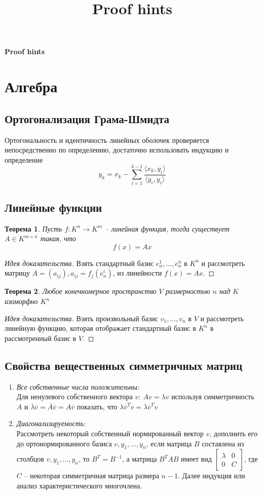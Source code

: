 \documentclass[10pt,a4paper]{article}
\title{Proof hints}
\newtheorem{theorem_ru}{Теорема}[section]
\newenvironment{sketch}
    {\begin{proof}[Идея доказательства]
    }
    { 
    \end{proof}
    }
\begin{document}
\begin{center}
\Large{\textbf{Proof hints}}
\end{center}
\tableofcontents

\section{Алгебра}
\subsection{Ортогонализация Грама-Шмидта}
Ортогональность и идентичность линейных оболочек проверяется непосредственно по определению, достаточно использовать индукцию и определение
\[
y_k=x_k-\sum_{i=1}^{k-1}\frac{\langle x_k, y_i\rangle}{\langle y_i, y_i\rangle}
\]
\subsection{Линейные функции}
\begin{theorem_ru}
Пусть $f:K^n\rightarrow K^m$ -- линейная функция, тогда существует $A\in K^{m\times n}$ такая, что 
$$
f(x)=Ax
$$
\end{theorem_ru}
\begin{proof}[Идея доказательства]
Взять стандартный базис $e_n^1, \ldots, e_n^n$ в $K^n$ и рассмотреть матрицу $A=(a_{ij}), a_{ij}=f_j(e_n^i)$, из линейности $f(x)=Ax$.
\end{proof}
\begin{theorem_ru}
Любое конечномерное пространство $V$ размерностью $n$ над $K$ изоморфно $K^n$
\end{theorem_ru}
\begin{sketch}
Взять произвольный базис $v_1, \ldots, v_n$ в $V$ и рассмотреть линейную функцию, которая отображает стандартный базис в $K^n$ в рассмотренный базис в $V$.
\end{sketch}

\subsection{Свойства вещественных симметричных матриц}
\begin{enumerate}
\item \textit{Все собственные числа положительны}:\\
Для ненулевого собственного вектора $v:~Av=\lambda v$ используя симметричность $A$ и $\overline{\lambda}\overline{v}=\overline{A}\overline{v}=A\overline{v}$ показать, что $\lambda \overline{v}^Tv=\overline{\lambda} \overline{v}^Tv$
\item \textit{Диагонализируемость}:\\
Рассмотреть некоторый собственный нормированный вектор $v$, дополнить его до ортонормированного базиса $v, y_1, \ldots, y_n$, если матрица $B$ составлена из столбцов $v, y_1, \ldots, y_n$, то $B^T=B^{-1}$, а матрица $B^TAB$ имеет вид
$\left[
\begin{array}{cc}
\lambda & 0\\
0 & C
\end{array}
\right]
$, где $C$ -- некоторая симметричная матрица размера $n-1$. Далее индукция или анализ характеристического многочлена.
\end{enumerate}
\end{document}
